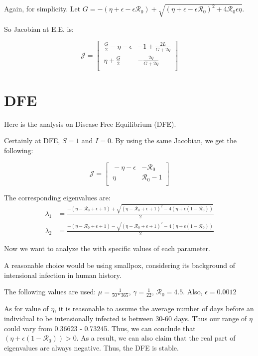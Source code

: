 \documentclass[12pt]{article}
\begin{document}
Again, for simplicity. Let $G=-(\eta+\epsilon-\epsilon\mathcal{R}_0)+\sqrt{(\eta+\epsilon-\epsilon\mathcal{R}_0)^2+4\mathcal{R}_0\epsilon \eta}$.

So Jacobian at E.E. is:

\begin{equation}
\mathcal{J} =
\begin{bmatrix}
    \ \frac{G}{2}-\eta-\epsilon       & -1+\frac{2L}{G+2\eta} \\
    \ \eta+\frac{G}{2}       & -\frac{2\eta}{G+2\eta} \\
\end{bmatrix}
\end{equation}

\section{DFE}
Here is the analysis on Disease Free Equilibrium (DFE).

Certainly at DFE, $S=1$ and $I=0$. By using the same Jacobian, we get the following:

\begin{equation}
\mathcal{J} =
\begin{bmatrix}
    \ -\eta-\epsilon       & -\mathcal{R}_0 \\
    \ \eta       & \mathcal{R}_0 -1 \\
\end{bmatrix}
\end{equation}

The corresponding eigenvalues are:
\begin{align}
\lambda_1 &=\frac{-(\eta-\mathcal{R}_0+\epsilon+1)+ \sqrt{(\eta-\mathcal{R}_0+\epsilon+1)^2-4(\eta+\epsilon(1-\mathcal{R}_0))}}{2}\\
\lambda_2 &=\frac{-(\eta-\mathcal{R}_0+\epsilon+1)- \sqrt{(\eta-\mathcal{R}_0+\epsilon+1)^2-4(\eta+\epsilon(1-\mathcal{R}_0))}}{2}
\end{align}

Now we want to analyze the with specific values of each parameter.

A reasonable choice would be using smallpox, considering its background of intensional infection in human history.

The following values are used: $\mu=\frac{1}{50*365}$, $\gamma=\frac{1}{22}$, $\mathcal{R}_0=4.5$. Also, $\epsilon=0.0012$

As for value of $\eta$, it is reasonable to assume the average number of days before an individual to be intensionally infected is between 30-60 days. Thus our range of $\eta$ could vary from 0.36623 - 0.73245. Thus, we can conclude that $(\eta+\epsilon(1-\mathcal{R}_0))>0$. As a result, we can also claim that the real part of eigenvalues are always negative. Thus, the DFE is stable. 
\end{document}
